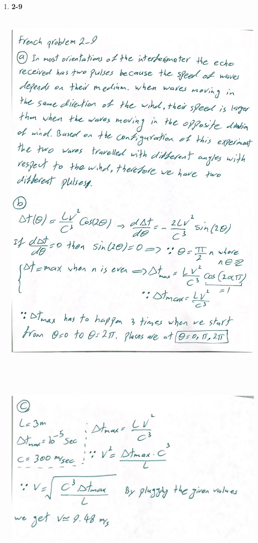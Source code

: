 \documentclass[fleqn]{article}
\begin{document}
  \begin{enumerate}
    \item \textbf{2-9}

    \begin{center}
      \includegraphics[height=18cm, width=14cm]{2-9A.JPG}
    \end{center}

    \pagebreak

    \begin{center}
      \includegraphics[height=10cm, width=14cm]{2-9B.JPG}
    \end{center}


\end{enumerate}
\end{document}
